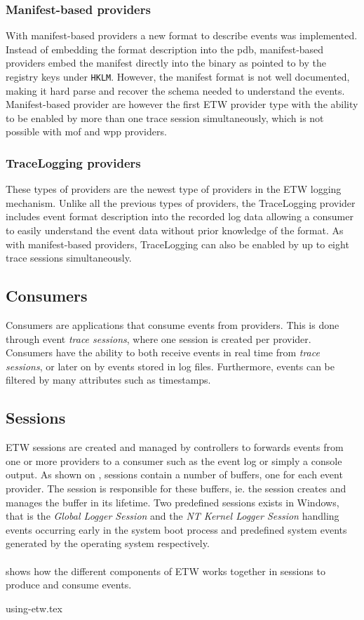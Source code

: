 \documentclass{report}
\begin{document}
\subsubsection{Manifest-based providers}
\label{sec:etw:providers:manifest-based}
With manifest-based providers a new format to describe events was implemented. Instead of embedding the format description into the \gls{pdb}, manifest-based providers embed the manifest directly into the binary as pointed to by the registry keys under \texttt{HKLM\SOFTWARE\Microsoft\Windows\CurrentVersion\WINEVT\Publishers}. However, the manifest format is not well documented, making it hard parse and recover the schema needed to understand the events\cite{url:etw:various-information}. Manifest-based provider are however the first \gls{ETW} provider type with the ability to be enabled by more than one trace session simultaneously, which is not possible with \gls{mof} and \gls{wpp} providers.

\subsubsection{TraceLogging providers}
These types of providers are the newest type of providers in the \gls{ETW} logging mechanism. Unlike all the previous types of providers, the TraceLogging provider includes event format description into the recorded log data\cite{url:etw:provider-types} allowing a consumer to easily understand the event data without prior knowledge of the format. As with manifest-based providers, TraceLogging can also be enabled by up to eight trace sessions simultaneously.

\subsection{Consumers}
Consumers are applications that consume events from providers. This is done through event \emph{trace sessions}, where one session is created per provider. Consumers have the ability to both receive events in real time from \emph{trace sessions}, or later on by events stored in log files. Furthermore, events can be filtered by many attributes such as timestamps.

\subsection{Sessions}
\gls{ETW} sessions are created and managed by controllers to forwards events from one or more providers to a consumer such as the event log or simply a console output. As shown on , sessions contain a number of buffers, one for each event provider. The session is responsible for these buffers, ie. the session creates and manages the buffer in its lifetime. Two predefined sessions exists in Windows, that is the \emph{Global Logger Session} and the \emph{NT Kernel Logger Session} handling events occurring early in the system boot process and predefined system events generated by the operating system respectively\cite{url:etw:trace:sessions}.
\\
\\
 shows how the different components of \gls{ETW} works together in sessions to produce and consume events.

{using-etw.tex}
\end{document}
